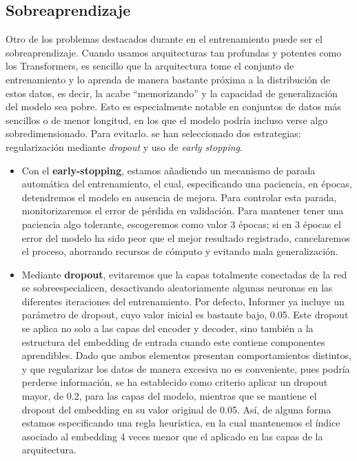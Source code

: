 \subsection{Sobreaprendizaje}

Otro de los problemas destacados durante en el entrenamiento puede ser el sobreaprendizaje. Cuando usamos arquitecturas tan profundas y potentes como los Transformers, es sencillo que la arquitectura tome el conjunto de entrenamiento y lo aprenda de manera bastante próxima a la distribución de estos datos, es decir, la acabe ``memorizando'' y la capacidad de generalización del modelo sea pobre. Esto es especialmente notable en conjuntos de datos más sencillos o de menor longitud, en los que el modelo podría incluso verse algo sobredimensionado. Para evitarlo. se han seleccionado dos estrategias: regularización mediante \textit{dropout} y uso de \textit{early stopping}.

\begin{itemize}
	\item Con el \textbf{early-stopping}, estamos añadiendo un mecanismo de parada automática del entrenamiento, el cual, especificando una paciencia, en épocas, detendremos el modelo en ausencia de mejora. Para controlar esta parada, monitorizaremos el error de pérdida en validación. Para mantener tener una paciencia algo tolerante, escogeremos como valor 3 épocas; si en 3 épocas el error del modelo ha sido peor que el mejor resultado registrado, cancelaremos el proceso, ahorrando recursos de cómputo y evitando mala generalización.
	\item Mediante \textbf{dropout}, evitaremos que la capas totalmente conectadas de la red se sobreespecialicen, desactivando aleatoriamente algunas neuronas en las diferentes iteraciones del entrenamiento. Por defecto, Informer ya incluye un parámetro de dropout, cuyo valor inicial es bastante bajo, 0.05. Este dropout se aplica no solo a las capas del encoder y decoder, sino también a la estructura del embedding de entrada cuando este contiene componentes aprendibles. Dado que ambos elementos presentan comportamientos distintos, y que regularizar los datos de manera excesiva no es conveniente, pues podría perderse información, se ha establecido como criterio aplicar un dropout mayor, de 0.2, para las capas del modelo, mientras que se mantiene el dropout del embedding en su valor original de 0.05. Así, de alguna forma estamos especificando una regla heurística, en la cual mantenemos el índice asociado al embedding 4 veces menor que el aplicado en las capas de la arquitectura.
\end{itemize}

